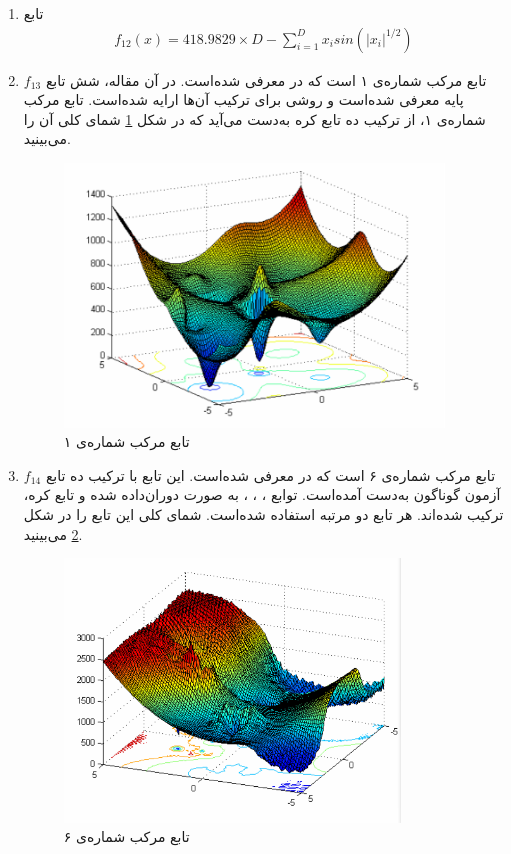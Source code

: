 \documentclass[12pt,a4paper]{article}
\theoremstyle{definition}
\theoremstyle{theorem}
\theoremstyle{definition}
\begin{document}
\begin{enumerate}
		\item
		  تابع
		\begin{align*}
		f_{12}(x) = 418.9829 \times D - \sum_{i=1}^D x_i sin\left(|x_i|^{1/2} \right)
		\end{align*}
		
		\item 
		$f_{13}$
		تابع مرکب شماره‌ی ۱ است که در \cite{32-cf} معرفی شده‌است. در آن مقاله، شش تابع پایه‌ معرفی شده‌است و روشی برای ترکیب آن‌ها ارایه شده‌است. تابع مرکب شماره‌ی ۱، از ترکیب ده تابع کره به‌دست می‌آید که در شکل \ref{fig:cf1} شمای کلی آن‌ را می‌بینید.
		\begin{figure}[!hbtp]
		\centering
		\caption{تابع مرکب شماره‌ی ۱ \cite{32-cf}}
		\label{fig:cf1}
		\includegraphics[height=7cm]{cf1.png}
		\end{figure}
   
		\item 
		$f_{14}$
		تابع مرکب شماره‌ی ۶ است که در \cite{32-cf} معرفی شده‌است. این تابع با ترکیب ده تابع آزمون گوناگون به‌دست آمده‌است. توابع
		،
		،
		،
		 به صورت دوران‌داده شده
		و تابع کره، ترکیب شده‌اند. هر تابع دو مرتبه استفاده شده‌است. شمای کلی این تابع را در شکل \ref{fig:cf6} می‌بینید.

		\begin{figure}[!hbtp]
		\centering
		\caption{تابع مرکب شماره‌ی ۶ \cite{32-cf}}
		\label{fig:cf6}
		\includegraphics[height=7cm]{cf6.png}
		\end{figure} 
		

\end{enumerate}
\end{document}
